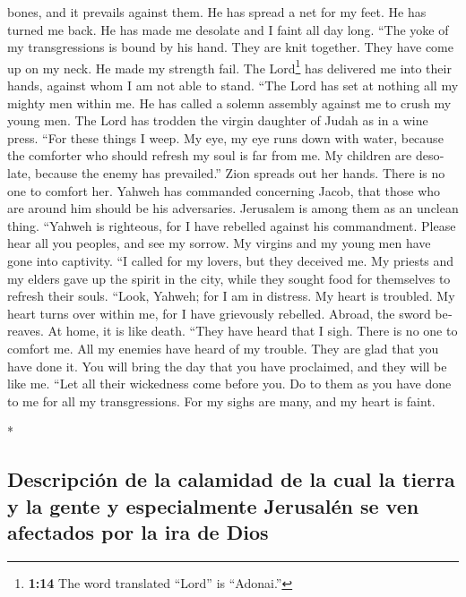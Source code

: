 \begin{paracol}{2}
\begin{otherlanguage}{english}
bones, and it prevails against them. He has spread a net for my feet. He
has turned me back. He has made me desolate and I faint all day long.
 ``The yoke of my transgressions is bound by his hand.
They are knit together. They have come up on my neck. He made my
strength fail. The Lord\footnote{\textbf{1:14} The word translated
  ``Lord'' is ``Adonai.''} has delivered me into their hands, against
whom I am not able to stand.  ``The Lord has set at
nothing all my mighty men within me. He has called a solemn assembly
against me to crush my young men. The Lord has trodden the virgin
daughter of Judah as in a wine press.  ``For these things
I weep. My eye, my eye runs down with water, because the comforter who
should refresh my soul is far from me. My children are desolate, because
the enemy has prevailed.''  Zion spreads out her hands.
There is no one to comfort her. Yahweh has commanded concerning Jacob,
that those who are around him should be his adversaries. Jerusalem is
among them as an unclean thing.  ``Yahweh is righteous,
for I have rebelled against his commandment. Please hear all you
peoples, and see my sorrow. My virgins and my young men have gone into
captivity.  ``I called for my lovers, but they deceived
me. My priests and my elders gave up the spirit in the city, while they
sought food for themselves to refresh their souls. 
``Look, Yahweh; for I am in distress. My heart is troubled. My heart
turns over within me, for I have grievously rebelled. Abroad, the sword
bereaves. At home, it is like death.  ``They have heard
that I sigh. There is no one to comfort me. All my enemies have heard of
my trouble. They are glad that you have done it. You will bring the day
that you have proclaimed, and they will be like me. 
``Let all their wickedness come before you. Do to them as you have done
to me for all my transgressions. For my sighs are many, and my heart is
faint.

\end{otherlanguage}

\switchcolumn[0]*

\hypertarget{descripciuxf3n-de-la-calamidad-de-la-cual-la-tierra-y-la-gente-y-especialmente-jerusaluxe9n-se-ven-afectados-por-la-ira-de-dios}{%
\subsection{Descripción de la calamidad de la cual la tierra y la gente
y especialmente Jerusalén se ven afectados por la ira de
Dios}\label{descripciuxf3n-de-la-calamidad-de-la-cual-la-tierra-y-la-gente-y-especialmente-jerusaluxe9n-se-ven-afectados-por-la-ira-de-dios}}


\end{paracol}
